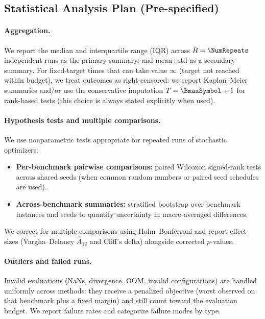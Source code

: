 \subsection{Statistical Analysis Plan (Pre-specified)}
\label{subsec:stats}

\paragraph{Aggregation.}
We report the median and interquartile range (IQR) across \(R=\NumRepeats\) independent runs as the primary summary,
and mean$\pm$std as a secondary summary.
For fixed-target times that can take value \(\infty\) (target not reached within budget), we treat outcomes as right-censored:
we report Kaplan--Meier summaries and/or use the conservative imputation \(T=\BmaxSymbol+1\) for rank-based tests
(this choice is always stated explicitly when used).

\paragraph{Hypothesis tests and multiple comparisons.}
We use nonparametric tests appropriate for repeated runs of stochastic optimizers:
\begin{itemize}
    \item \textbf{Per-benchmark pairwise comparisons:} paired Wilcoxon signed-rank tests across shared seeds
    (when common random numbers or paired seed schedules are used).
    \item \textbf{Across-benchmark summaries:} stratified bootstrap over benchmark instances and seeds to quantify uncertainty
    in macro-averaged differences.
\end{itemize}
We correct for multiple comparisons using Holm--Bonferroni and report effect sizes (Vargha--Delaney \(\hat{A}_{12}\) and Cliff's delta)
alongside corrected \(p\)-values.

\paragraph{Outliers and failed runs.}
Invalid evaluations (NaNs, divergence, OOM, invalid configurations) are handled uniformly across methods:
they receive a penalized objective (worst observed on that benchmark plus a fixed margin) and still count toward the evaluation budget.
We report failure rates and categorize failure modes by type.


